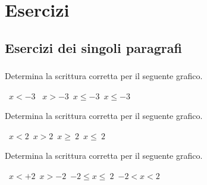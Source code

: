 
\section{Esercizi}

\subsection{Esercizi dei singoli paragrafi}

\subsubsection*{}

\begin{esercizio}
 \label{ese:21.1}
 Determina la scrittura corretta per il seguente grafico.
 \begin{center}
  

 \boxA\quad~\(x<-3\) \quad\boxB\quad~\(x>-3\)\quad\boxC\quad~\(x\le -3\)\quad\boxD\quad~\(x\le -3\)
 \end{center}

\end{esercizio}

\begin{esercizio}
 \label{ese:21.2}
 Determina la scrittura corretta per il seguente grafico.
  \begin{center}
  

\boxA\quad~\(x<2\)\quad\boxB\quad~\(x>2\)\quad\boxC\quad~\(x\ge~2\)\quad\boxD\quad~\(x\le~2\)
 \end{center}
\end{esercizio}

\begin{esercizio}
 \label{ese:21.3}
 Determina la scrittura corretta per il seguente grafico.
  \begin{center}
  

\boxA\quad~\(x<+2\)\quad\boxB\quad~\(x>-2\)\quad\boxC\quad~\(-2\le x\le~2\)\quad\boxD\quad~\(-2<x<2\)
 \end{center}
\end{esercizio}

